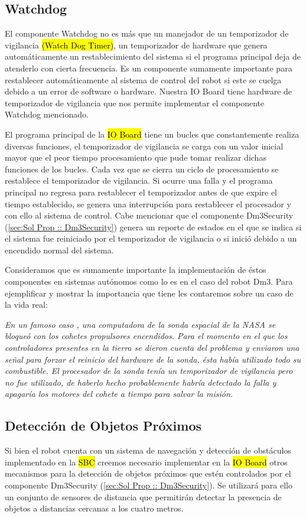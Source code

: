 \documentclass[withindex,glossary]{cam-thesis}
\begin{document}
\subsection{Watchdog} \label{sec: Sol Prop :: Watchdog}
El componente Watchdog no es más que un manejador de un temporizador de vigilancia \hl{(Watch Dog Timer)}, un temporizador de hardware que genera automáticamente un restablecimiento del sistema si el programa principal deja de atenderlo con cierta frecuencia. Es un componente sumamente importante para  restablecer automáticamente al sistema de control del robot si este se cuelga debido a un error de software o hardware. Nuestra IO Board tiene hardware de temporizador de vigilancia que nos permite implementar el componente Watchdog mencionado.

El programa principal de la \hl{IO Board} tiene un bucles que constantemente realiza diversas funciones, el temporizador de vigilancia se carga con un valor inicial mayor que el peor tiempo procesamiento que pude tomar realizar dichas funciones de los bucles. Cada vez que se cierra un ciclo de procesamiento se restablece el temporizador de vigilancia. Si ocurre una falla y el programa principal no regresa para restablecer el temporizador antes de que expire el tiempo establecido, se genera una interrupción para restablecer el procesador y con ello al sistema de control.
Cabe mencionar que el componente Dm3Security (\ref{sec:Sol Prop :: Dm3Security}) genera un reporte de estados en el que se indica si el sistema fue reiniciado por el temporizador de vigilancia o si inició debido a un encendido normal del sistema.

Consideramos que es sumamente importante la implementación de éstos componentes en sistemas autónomos como lo es en el caso del robot Dm3. Para ejemplificar y mostrar la importancia que tiene les contaremos sobre un caso de la vida real:

\textit{En un famoso caso \cite{Clementine}, una computadora de la sonda espacial de la NASA se bloqueó con los cohetes propulsores encendidos. Para el momento en el que los controladores presentes en la tierra se dieron cuenta del problema y enviaron una señal para forzar el reinicio del hardware de la sonda, ésta había utilizado todo su combustible. El procesador de la sonda tenía un temporizador de vigilancia pero no fue utilizado, de haberlo hecho probablemente habría detectado la falla y apagaría los motores del cohete a tiempo para salvar la misión.}

\subsection{Detección de Objetos Próximos} \label{sec:Sol Prop :: detección de objetos próximos}
Si bien el robot cuenta con un sistema de navegación y detección de obstáculos implementado en la \hl{SBC} creemos necesario implementar en la \hl{IO Board} otros mecanismos para la detección de objetos próximos que estén controlados por el componente Dm3Security (\ref{sec:Sol Prop :: Dm3Security}). Se utilizará para ello un conjunto de sensores de distancia que permitirán detectar la presencia de objetos a distancias cercanas a los cuatro metros. 
\end{document}
